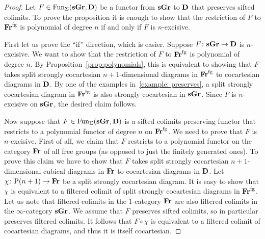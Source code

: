 \documentclass[psamsfonts]{amsart}
\theoremstyle{plain}
\theoremstyle{definition}
\theoremstyle{remark}
\newcommand{\catname}[1]{{\normalfont\textbf{#1}}}
\newcommand{\fr}{\allfr^{\mathrm{fg}}}
\newcommand{\allfr}{\catname{Fr}}
\newcommand{\sgr}{\catname{sGr}}
\newcommand{\power}{\mathrm{P}}
\DeclareMathOperator{\fun}{Fun}
\begin{document}
\begin{proof}
Let $F\in \fun_{\Sigma}(\sgr, \catname{D})$ be a functor from $\sgr$ to $\catname{D}$ that preserves sifted colimits. To prove the proposition it is enough to show that the restriction of $F$ to $\fr$ is polynomial of degree $n$ if and only if $F$ is $n$-excisive.

First let us prove the ``if'' direction, which is easier. Suppose $F\colon \sgr \to \catname{D}$ is $n$-excisive. We want to show that the restriction of $F$ to $\fr$ is polynomial of degree $n$. By Proposition~\ref{prop:polynomials}, this is equivalent to showing that $F$ takes split strongly cocartesian $n+1$-dimensional diagrams in $\fr$ to cocartesian diagrams in $\catname{D}$. By one of the examples in~\ref{example: preserves}, a split strongly cocartesian diagram in $\fr$ is also strongly cocartesian in $\sgr$. Since $F$ is $n$-excisive on $\sgr$, the desired claim follows.

Now suppose that $F\in \fun_{\Sigma}(\sgr, \catname{D}) $ is a sifted colimits preserving functor that restricts to a polynomial functor of degree $n$ on $\fr$. We need to prove that $F$ is $n$-excisive. First of all, we claim that $F$ restricts to a polynomial functor on the category $\allfr$ of all free groups (as opposed to just the finitely generated ones). To prove this claim we have to show that $F$ takes split strongly cocartesian $n+1$-dimensional cubical diagrams in $\allfr$ to cocartesian diagrams in $\catname{D}$. Let $\chi\colon \power(n+1)\to \allfr$ be a split strongly cocartesian diagram. It is easy to show that $\chi$ is equivalent to a filtered colimit of split strongly cocartesian diagrams in $\fr$. Let us note that filtered colimits in the $1$-category $\allfr$ are also filtered colimits in the $\infty$-category $\sgr$. We assume that $F$ preserves sifted colimits, so in particular preserves filtered colimits. It follows that $F\circ \chi$ is equivalent to a filtered colimit of cocartesian diagrams, and thus it is itself cocartesian.


\end{proof}
\end{document}
